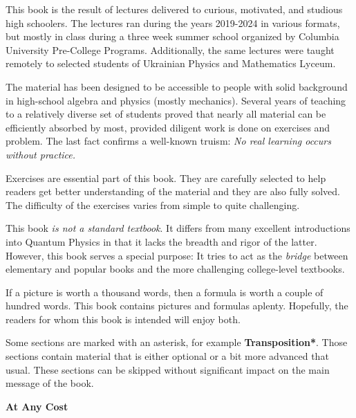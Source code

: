 This book is the result of lectures delivered to curious, motivated, and studious high schoolers. The lectures ran  during the years 2019-2024 in various formats, but mostly in class during a three week summer school organized by Columbia University Pre-College Programs. Additionally, the same lectures were taught remotely to selected students of Ukrainian Physics and Mathematics Lyceum. 

The material has been designed to be accessible to people with solid background in high-school algebra and physics (mostly mechanics). Several years of teaching to a relatively diverse set of students proved that nearly all material can be efficiently absorbed by most, provided diligent work is done on exercises and problem. The last fact confirms a well-known truism: \emph{No real learning occurs without practice.}

Exercises are essential part of this book.  They are carefully selected to help readers get better understanding of the material and they are also fully solved. The difficulty of the exercises varies from simple to quite challenging.

This book \emph{is not a standard textbook}. It differs from many excellent introductions into Quantum Physics in that it lacks the breadth and rigor of the latter. However, this book serves a special purpose: It tries to act as the \emph{bridge} between  elementary and popular books and the more challenging college-level textbooks. 

If a picture is worth a thousand words, then a formula is worth a couple of hundred words. This book contains pictures and formulas aplenty. Hopefully, the readers for whom this book is intended will enjoy both.

Some sections are marked with an asterisk, for example
{\bf Transposition*}. Those sections contain material that is either
optional or a bit more advanced that usual. These sections can be
skipped without significant impact on the main message of the book.


\begin{center}
	{\bf At Any Cost}
\end{center}

